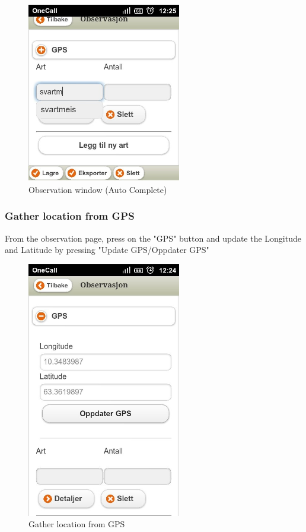 \begin{figure}[h!]
\centering
 \includegraphics[width=0.6\textwidth,height=0.6\textwidth]{appendix/pic/auto.jpg} 
 \caption{Observation window (Auto Complete)}
 \end{figure}



\pagebreak
\subsubsection{Gather location from GPS}
From the observation page, press on the "GPS" button and update the Longitude and Latitude by pressing "Update GPS/Oppdater GPS"

\begin{figure}[h!]
\centering
 \includegraphics[width=0.6\textwidth,height=0.7\textwidth]{appendix/pic/gps.jpg} 
 \caption{Gather location from GPS}
 \end{figure}

